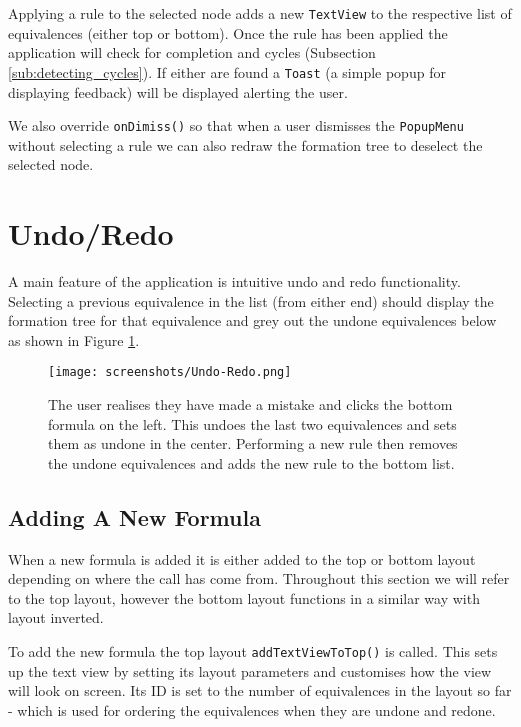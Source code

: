 \documentclass[draft]{report}
\begin{document}
Applying a rule to the selected node adds a new {\tt TextView} to the respective list of equivalences (either top or bottom). Once the rule has been applied the application will check for completion and cycles (Subsection \ref{sub:detecting_cycles}). If either are found a {\tt Toast} (a simple popup for displaying feedback) will be displayed alerting the user.

We also override {\tt onDimiss()} so that when a user dismisses the {\tt PopupMenu} without selecting a rule we can also redraw the formation tree to deselect the selected node.

\section{Undo/Redo}
\label{sec:undo_redo}

A main feature of the application is intuitive undo and redo functionality. Selecting a previous equivalence in the list (from either end) should display the formation tree for that equivalence and grey out the undone equivalences below as shown in Figure \ref{undoredo}.

\begin{figure}[ht]
    \centering
    \texttt{[image: screenshots/Undo-Redo.png]}
    \caption{The user realises they have made a mistake and clicks the bottom formula on the left. This undoes the last two equivalences and sets them as undone in the center. Performing a new rule then removes the undone equivalences and adds the new rule to the bottom list.}
    \label{undoredo}
\end{figure}

\subsection{Adding A New Formula}

When a new formula is added it is either added to the top or bottom layout depending on where the call has come from. Throughout this section we will refer to the top layout, however the bottom layout functions in a similar way with layout inverted.

To add the new formula the top layout {\tt addTextViewToTop()} is called. This sets up the text view by setting its layout parameters and customises how the view will look on screen. Its ID is set to the number of equivalences in the layout so far - which is used for ordering the equivalences when they are undone and redone.
\end{document}
